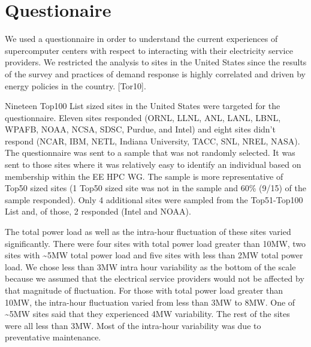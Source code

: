 \documentclass{llncs}
\begin{document}
\section{Questionaire} 
We used a questionnaire in order to understand the current experiences of
supercomputer centers with respect to interacting with their electricity
service providers. We restricted the analysis to sites in the United States
since the results of the survey and practices of demand response is highly
correlated and driven by energy policies in the country. 
\cite{torriti_demand_2010}
[Tor10].

Nineteen Top100 List sized sites in the United States were targeted for the
questionnaire. Eleven sites responded (ORNL, LLNL, ANL, LANL, LBNL, WPAFB,
NOAA, NCSA, SDSC, Purdue, and Intel) and eight sites didn't respond (NCAR,
IBM, NETL, Indiana University, TACC, SNL, NREL, NASA). The questionnaire was
sent to a sample that was not randomly selected. It was sent to those sites
where it was relatively easy to identify an individual based on membership
within the EE HPC WG. The sample is more representative of Top50 sized sites
(1 Top50 sized site was not in the sample and 60{\%} (9/15) of the sample
responded). Only 4 additional sites were sampled from the Top51-Top100 List
and, of those, 2 responded (Intel and NOAA).

The total power load as well as the intra-hour fluctuation of these sites
varied significantly. There were four sites with total power load greater
than 10MW, two sites with \textasciitilde 5MW total power load and five
sites with less than 2MW total power load. We chose less than 3MW intra hour
variability as the bottom of the scale because we assumed that the
electrical service providers would not be affected by that magnitude of
fluctuation. For those with total power load greater than 10MW, the
intra-hour fluctuation varied from less than 3MW to 8MW. One of
\textasciitilde 5MW sites said that they experienced 4MW variability. The
rest of the sites were all less than 3MW. Most of the intra-hour variability
was due to preventative maintenance.
\end{document}
